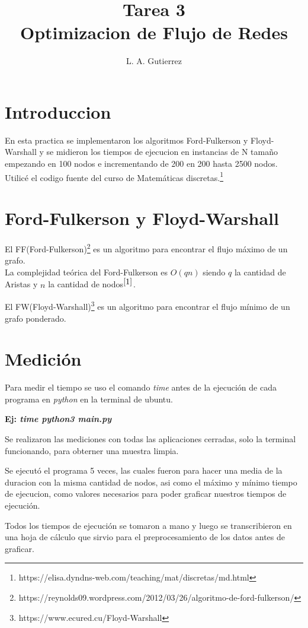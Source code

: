 \documentclass[12pt,letterpaper]{article}
\title{Tarea 3 \\ Optimizacion de Flujo de Redes}
\author{L. A. Gutierrez}
\begin{document}
\maketitle

\section*{Introduccion}
En esta practica se implementaron los algoritmos Ford-Fulkerson y Floyd-Warshall y se midieron los tiempos de ejecucion en instancias de N tamaño empezando en 100 nodos e incrementando de 200 en 200 hasta 2500 nodos. 
Utilicé el codigo fuente del curso de Matemáticas discretas.\footnote{ https://elisa.dyndns-web.com/teaching/mat/discretas/md.html }

\section*{Ford-Fulkerson y Floyd-Warshall}
El FF(Ford-Fulkerson)\footnote{ \label{1} https://reynolds09.wordpress.com/2012/03/26/algoritmo-de-ford-fulkerson/ }
 es un algoritmo para encontrar el flujo máximo de un grafo.
\\ La complejidad teórica del Ford-Fulkerson es $O(qn)$ siendo $q$ la cantidad de Aristas y $n$ la cantidad de nodos$^{\ref{1}}$.

El FW(Floyd-Warshall)\footnote{ https://www.ecured.cu/Floyd-Warshall} 
 es un algoritmo para encontrar el flujo mínimo de un grafo ponderado.

\section*{Medición}
Para medir el tiempo se uso el comando \textit{time} antes de la ejecución de cada programa en \textit{python} en la terminal de ubuntu.

	\textbf{Ej: \textit{time python3 main.py}}

Se realizaron las mediciones con todas las aplicaciones cerradas, solo la terminal funcionando, para obterner una muestra limpia.

Se ejecutó el programa 5 veces, las cuales fueron para hacer una media de la duracion con la misma cantidad de nodos, asi como el máximo y mínimo tiempo de ejecucion, como valores necesarios para poder graficar nuestros tiempos de ejecución.

Todos los tiempos de ejecución se tomaron a mano y luego se transcribieron en una hoja de cálculo que sirvio para el preprocesamiento de los datos antes de graficar.
\end{document}
